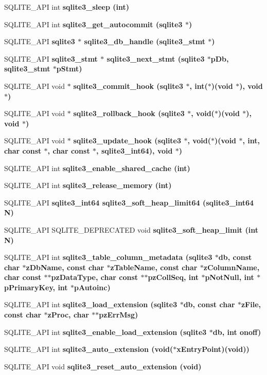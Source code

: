 \begin{CompactItemize}
\item 
SQLITE\_\-API int \bf{sqlite3\_\-sleep} (int)
\item 
SQLITE\_\-API int \bf{sqlite3\_\-get\_\-autocommit} (\bf{sqlite3} $\ast$)
\item 
SQLITE\_\-API \bf{sqlite3} $\ast$ \bf{sqlite3\_\-db\_\-handle} (\bf{sqlite3\_\-stmt} $\ast$)
\item 
SQLITE\_\-API \bf{sqlite3\_\-stmt} $\ast$ \bf{sqlite3\_\-next\_\-stmt} (\bf{sqlite3} $\ast$p\-Db, \bf{sqlite3\_\-stmt} $\ast$p\-Stmt)
\item 
SQLITE\_\-API void $\ast$ \bf{sqlite3\_\-commit\_\-hook} (\bf{sqlite3} $\ast$, int($\ast$)(void $\ast$), void $\ast$)
\item 
SQLITE\_\-API void $\ast$ \bf{sqlite3\_\-rollback\_\-hook} (\bf{sqlite3} $\ast$, void($\ast$)(void $\ast$), void $\ast$)
\item 
SQLITE\_\-API void $\ast$ \bf{sqlite3\_\-update\_\-hook} (\bf{sqlite3} $\ast$, void($\ast$)(void $\ast$, int, char const $\ast$, char const $\ast$, \bf{sqlite3\_\-int64}), void $\ast$)
\item 
SQLITE\_\-API int \bf{sqlite3\_\-enable\_\-shared\_\-cache} (int)
\item 
SQLITE\_\-API int \bf{sqlite3\_\-release\_\-memory} (int)
\item 
SQLITE\_\-API \bf{sqlite3\_\-int64} \bf{sqlite3\_\-soft\_\-heap\_\-limit64} (\bf{sqlite3\_\-int64} N)
\item 
SQLITE\_\-API SQLITE\_\-DEPRECATED void \bf{sqlite3\_\-soft\_\-heap\_\-limit} (int N)
\item 
SQLITE\_\-API int \bf{sqlite3\_\-table\_\-column\_\-metadata} (\bf{sqlite3} $\ast$\bf{db}, const char $\ast$z\-Db\-Name, const char $\ast$z\-Table\-Name, const char $\ast$z\-Column\-Name, char const $\ast$$\ast$pz\-Data\-Type, char const $\ast$$\ast$pz\-Coll\-Seq, int $\ast$p\-Not\-Null, int $\ast$p\-Primary\-Key, int $\ast$p\-Autoinc)
\item 
SQLITE\_\-API int \bf{sqlite3\_\-load\_\-extension} (\bf{sqlite3} $\ast$\bf{db}, const char $\ast$z\-File, const char $\ast$z\-Proc, char $\ast$$\ast$pz\-Err\-Msg)
\item 
SQLITE\_\-API int \bf{sqlite3\_\-enable\_\-load\_\-extension} (\bf{sqlite3} $\ast$\bf{db}, int onoff)
\item 
SQLITE\_\-API int \bf{sqlite3\_\-auto\_\-extension} (void($\ast$x\-Entry\-Point)(void))
\item 
SQLITE\_\-API void \bf{sqlite3\_\-reset\_\-auto\_\-extension} (void)
\item 
$$
\end{CompactItemize}
